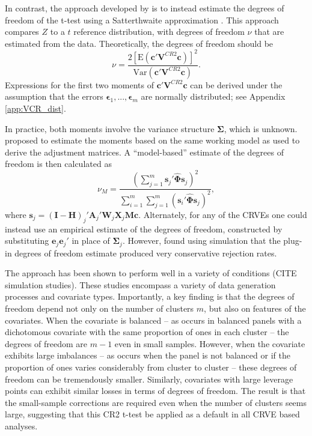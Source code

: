\documentclass[12pt]{article}
\newcommand{\E}{\text{E}}
\newcommand{\Var}{\text{Var}}
\newcommand{\bm}{\mathbf}
\newcommand{\bs}{\boldsymbol}
\begin{document}
In contrast, the approach developed by \citet{McCaffrey2001generalizations} is to instead estimate the degrees of freedom of the t-test using a Satterthwaite approximation \citep{Satterthwaite1946approximate}.
This approach compares $Z$ to a $t$ reference distribution, with degrees of freedom $\nu$ that are estimated from the data. 
Theoretically, the degrees of freedom should be 
\begin{equation}
\label{eq:nu_Satterthwaite}
\nu = \frac{2\left[\E\left(\bm{c}'\bm{V}^{CR2}\bm{c}\right)\right]^2}{\Var\left(\bm{c}'\bm{V}^{CR2}\bm{c}\right)}.
\end{equation}
Expressions for the first two moments of $\bm{c}'\bm{V}^{CR2}\bm{c}$ can be derived under the assumption that the errors $\bs\epsilon_1,...,\bs\epsilon_m$ are normally distributed; see Appendix \ref{app:VCR_dist}. 


In practice, both moments involve the variance structure $\bs\Sigma$, which is unknown. 
\citet{McCaffrey2001generalizations} proposed to estimate the moments based on the same working model as used to derive the adjustment matrices. 
A ``model-based'' estimate of the degrees of freedom is then calculated as 
\begin{equation}
\nu_{M} = \frac{\left(\sum_{j=1}^m \bm{s}_j' \hat{\bs\Phi} \bm{s}_j\right)^2}{\sum_{i=1}^m \sum_{j=1}^m \left(\bm{s}_i' \hat{\bs\Phi} \bm{s}_j\right)^2},
\end{equation}
where $\bm{s}_j = \left(\bm{I} - \bm{H}\right)_j'\bm{A}_j'\bm{W}_j\bm{X}_j\bm{M}\bm{c}$. 
Alternately, for any of the CRVEs one could instead use an empirical estimate of the degrees of freedom, constructed by substituting $\bm{e}_j \bm{e}_j'$ in place of $\bs\Sigma_j$. 
However, \citet{Bell2002bias} found using simulation that the plug-in degrees of freedom estimate produced very conservative rejection rates. 

The \citet{McCaffrey2001generalizations} approach has been shown to perform well in a variety of conditions (CITE simulation studies). These studies encompass a variety of data generation processes and covariate types. Importantly, a key finding is that the degrees of freedom depend not only on the number of clusters $m$, but also on features of the covariates. When the covariate is balanced -- as occurs in balanced panels with a dichotomous covariate with the same proportion of ones in each cluster -- the degrees of freedom are $m - 1$ even in small samples. However, when the covariate exhibits large imbalances -- as occurs when the panel is not balanced or if the proportion of ones varies considerably from cluster to cluster -- these degrees of freedom can be tremendously smaller. Similarly, covariates with large leverage points can exhibit similar losses in terms of degrees of freedom. The result is that the small-sample corrections are required even when the number of clusters seems large, suggesting that this CR2 t-test be applied as a default in all CRVE based analyses. 
\end{document}
